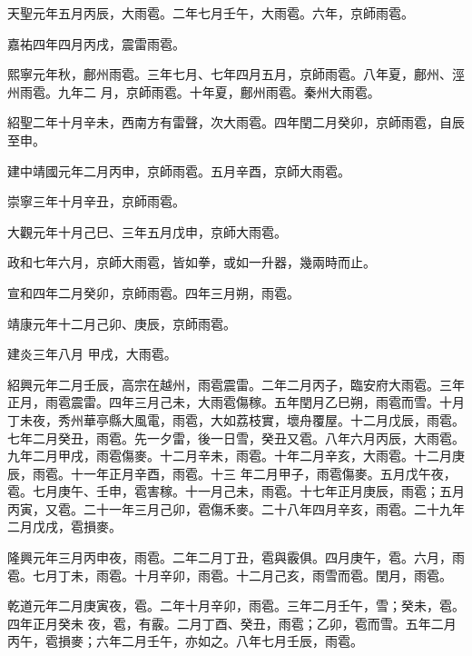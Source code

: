 \begin{pinyinscope}
 天聖元年五月丙辰，大雨雹。二年七月壬午，大雨雹。六年，京師雨雹。



 嘉祐四年四月丙戌，震雷雨雹。



 熙寧元年秋，鄜州雨雹。三年七月、七年四月五月，京師雨雹。八年夏，鄜州、涇州雨雹。九年二
 月，京師雨雹。十年夏，鄜州雨雹。秦州大雨雹。



 紹聖二年十月辛未，西南方有雷聲，次大雨雹。四年閏二月癸卯，京師雨雹，自辰至申。



 建中靖國元年二月丙申，京師雨雹。五月辛酉，京師大雨雹。



 崇寧三年十月辛丑，京師雨雹。



 大觀元年十月己巳、三年五月戊申，京師大雨雹。



 政和七年六月，京師大雨雹，皆如拳，或如一升器，幾兩時而止。



 宣和四年二月癸卯，京師雨雹。四年三月朔，雨雹。



 靖康元年十二月己卯、庚辰，京師雨雹。



 建炎三年八月
 甲戌，大雨雹。



 紹興元年二月壬辰，高宗在越州，雨雹震雷。二年二月丙子，臨安府大雨雹。三年正月，雨雹震雷。四年三月己未，大雨雹傷稼。五年閏月乙巳朔，雨雹而雪。十月丁未夜，秀州華亭縣大風電，雨雹，大如荔枝實，壞舟覆屋。十二月戊辰，雨雹。七年二月癸丑，雨雹。先一夕雷，後一日雪，癸丑又雹。八年六月丙辰，大雨雹。九年二月甲戌，雨雹傷麥。十二月辛未，雨雹。十年二月辛亥，大雨雹。十二月庚辰，雨雹。十一年正月辛酉，雨雹。十三
 年二月甲子，雨雹傷麥。五月戊午夜，雹。七月庚午、壬申，雹害稼。十一月己未，雨雹。十七年正月庚辰，雨雹；五月丙寅，又雹。二十一年三月己卯，雹傷禾麥。二十八年四月辛亥，雨雹。二十九年二月戊戌，雹損麥。



 隆興元年三月丙申夜，雨雹。二年二月丁丑，雹與霰俱。四月庚午，雹。六月，雨雹。七月丁未，雨雹。十月辛卯，雨雹。十二月己亥，雨雪而雹。閏月，雨雹。



 乾道元年二月庚寅夜，雹。二年十月辛卯，雨雹。三年二月壬午，雪；癸未，雹。四年正月癸未
 夜，雹，有霰。二月丁酉、癸丑，雨雹；乙卯，雹而雪。五年二月丙午，雹損麥；六年二月壬午，亦如之。八年七月壬辰，雨雹。




\end{pinyinscope}
